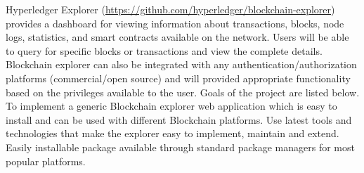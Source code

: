 Hyperledger Explorer (\url{https://github.com/hyperledger/blockchain-explorer}) provides a dashboard for viewing information about transactions, blocks, node logs, statistics,  and smart contracts available on the network. Users will be able to query for specific blocks or transactions and view the complete details. Blockchain explorer can also be integrated with any authentication/authorization platforms (commercial/open source) and will provided appropriate functionality based on the privileges available to the user. 
Goals of the project are listed below.
To implement a generic Blockchain explorer web application which is easy to install and can be used with different Blockchain platforms.
Use latest tools and technologies that make the explorer easy to implement, maintain and extend.
Easily installable package available through standard package managers for most popular platforms.

